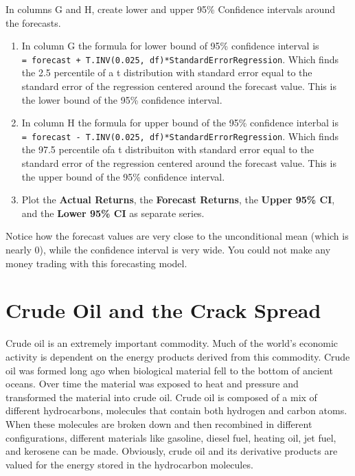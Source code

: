 \documentclass[
]{book}
\begin{document}
In columns G and H, create lower and upper 95\% Confidence intervals around the forecasts.

\begin{enumerate}
\def\labelenumi{\arabic{enumi}.}
\setcounter{enumi}{9}
\item
  In column G the formula for lower bound of 95\% confidence interval is \texttt{=\ forecast\ +\ T.INV(0.025,\ df)*StandardErrorRegression}. Which finds the 2.5 percentile of a t distribution with standard error equal to the standard error of the regression centered around the forecast value. This is the lower bound of the 95\% confidence interval.
\item
  In column H the formula for upper bound of the 95\% confidence interbal is \texttt{=\ forecast\ -\ T.INV(0.025,\ df)*StandardErrorRegression}. Which finds the 97.5 percentile ofa t distribuiton with standard error equal to the standard error of the regression centered around the forecast value. This is the upper bound of the 95\% confidence interval.
\item
  Plot the \textbf{Actual Returns}, the \textbf{Forecast Returns}, the \textbf{Upper 95\% CI}, and the \textbf{Lower 95\% CI} as separate series.
\end{enumerate}

Notice how the forecast values are very close to the unconditional mean (which is nearly 0), while the confidence interval is very wide. You could not make any money trading with this forecasting model.

\hypertarget{crude-oil-and-the-crack-spread}{%
\chapter{Crude Oil and the Crack Spread}\label{crude-oil-and-the-crack-spread}}

Crude oil is an extremely important commodity. Much of the world's economic activity is dependent on the energy products derived from this commodity. Crude oil was formed long ago when biological material fell to the bottom of ancient oceans. Over time the material was exposed to heat and pressure and transformed the material into crude oil. Crude oil is composed of a mix of different hydrocarbons, molecules that contain both hydrogen and carbon atoms. When these molecules are broken down and then recombined in different configurations, different materials like gasoline, diesel fuel, heating oil, jet fuel, and kerosene can be made. Obviously, crude oil and its derivative products are valued for the energy stored in the hydrocarbon molecules.
\end{document}
